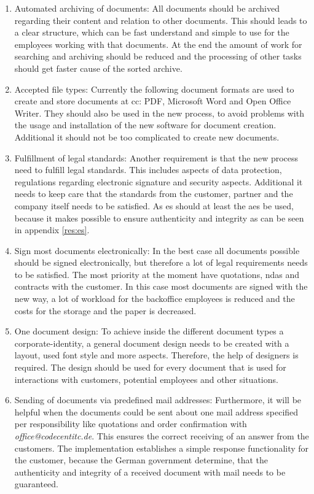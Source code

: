 \begin{enumerate}
	 \item Automated archiving of documents: \newline
	 All documents should be archived regarding their content and relation to other documents. This should leads to a clear structure, which can be fast understand and simple to use for the employees working with that documents. At the end the amount of work for searching and archiving should be reduced and the processing of other tasks should get faster cause of the sorted archive.
	 \item Accepted file types: \newline
	 Currently the following document formats are used to create and store documents at \gls{cc}: \gls{PDF}, Microsoft Word and Open Office Writer. They should also be used in the new process, to avoid problems with the usage and installation of the new software for document creation. Additional it should not be too complicated to create new documents.
	 \item Fulfillment of legal standards: \newline
	 Another requirement is that the new process need to fulfill legal standards. This includes aspects of data protection, regulations regarding electronic signature and security aspects. Additional it needs to keep care that the standards from the customer, partner and the company itself needs to be satisfied. \newline
	 As \gls{es} should at least the \gls{aes} be used, because it makes possible to ensure authenticity and integrity as can be seen in appendix \ref{res:es}.
	 \item Sign most documents electronically: \newline
	 In the best case all documents possible should be signed electronically, but therefore a lot of legal requirements needs to be satisfied. The most priority at the moment have quotations, \glspl{nda} and contracts with the customer. In this case most documents are signed with the new way, a lot of workload for the backoffice employees is reduced and the costs for the storage and the paper is decreased.
	 \item One document design: \newline
	 To achieve inside the different document types a corporate-identity, a general document design needs to be created with a layout, used font style and more aspects. Therefore, the help of designers is required. The design should be used for every document that is used for interactions with customers, potential employees and other situations.
	 \item Sending of documents via predefined mail addresses: \newline
	 Furthermore, it will be helpful when the documents could be sent about one mail address specified per responsibility like quotations and order confirmation with \textit{office@codecentitc.de}. This ensures the correct receiving of an answer from the customers. The implementation establishes a simple response functionality for the customer, because the German government determine, that the authenticity and integrity of a received document with mail needs to be guaranteed.
\end{enumerate}
